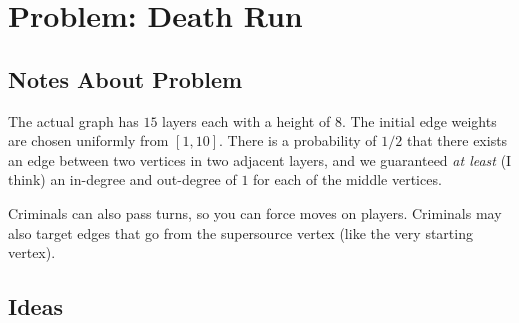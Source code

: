 \documentclass[a4paper, 12pt]{article}
\begin{document}
\section*{Problem: Death Run}

\subsection*{Notes About Problem}
The actual graph has \( 15 \) layers each with a height of \( 8 \). The initial edge weights are chosen uniformly from \( [1, 10] \). There is a probability of \( 1/2 \) that there exists an edge between two vertices in two adjacent layers, and we guaranteed \textit{at least} (I think) an in-degree and out-degree of \( 1 \) for each of the middle vertices.

Criminals can also pass turns, so you can force moves on players. Criminals may also target edges that go from the supersource vertex (like the very starting vertex).

\subsection*{Ideas}
\end{document}
